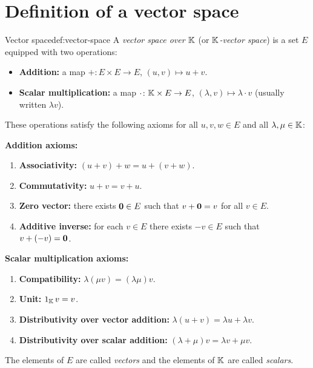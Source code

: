 \section{Definition of a vector space}\label{sec:vs-definition}

\begin{definition}{Vector space}{def:vector-space}
A \emph{vector space over ${\mathbb{K}}$} (or \emph{${\mathbb{K}}$-vector space}) is a set
$E$ equipped with two operations:
\begin{itemize}
  \item \textbf{Addition:} a map
    $+\colon E\times E\to E$, $(u,v)\mapsto u+v$.
  \item \textbf{Scalar multiplication:}
    a map $\cdot\colon{\mathbb{K}}\times E\to E$, $(\lambda,v)\mapsto \lambda\cdot v$
    (usually written $\lambda v$).
\end{itemize}
These operations satisfy the following axioms for all
$u,v,w\in E$ and all $\lambda,\mu\in{\mathbb{K}}$:

\medskip
\noindent\textbf{Addition axioms:}
\begin{enumerate}[label=\textbf{(V\arabic*)}]
  \item\label{ax:assoc} \textbf{Associativity:}
    $(u+v)+w = u+(v+w)$.
  \item\label{ax:comm} \textbf{Commutativity:}
    $u+v = v+u$.
  \item\label{ax:zero} \textbf{Zero vector:}
    there exists $\mathbf{0}\in E$ such that $v+\mathbf{0} = v$ for all $v\in E$.
  \item\label{ax:inverse} \textbf{Additive inverse:}
    for each $v\in E$ there exists $-v\in E$ such that $v+(-v)=\mathbf{0}$.
\end{enumerate}

\medskip
\noindent\textbf{Scalar multiplication axioms:}
\begin{enumerate}[label=\textbf{(V\arabic*)},resume]
  \item\label{ax:compat} \textbf{Compatibility:}
    $\lambda(\mu v) = (\lambda\mu) v$.
  \item\label{ax:unit} \textbf{Unit:}
    $1_{\mathbb{K}}\, v = v$.
  \item\label{ax:dist-scalar} \textbf{Distributivity over vector addition:}
    $\lambda(u+v) = \lambda u + \lambda v$.
  \item\label{ax:dist-field} \textbf{Distributivity over scalar addition:}
    $(\lambda+\mu)v = \lambda v + \mu v$.
\end{enumerate}
The elements of $E$ are called \emph{vectors} and the
elements of ${\mathbb{K}}$ are called \emph{scalars}.
\end{definition}

